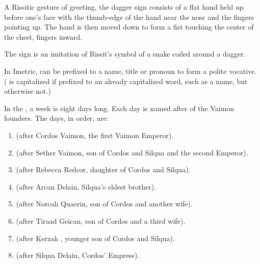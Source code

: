 \begin{gloss}
A Rissitic gesture of greeting, the dagger sign consists of a flat hand held up before one's face with the thumb-edge of the hand near the nose and the fingers pointing up. The hand is then moved down to form a fist touching the center of the chest, fingers inward. 

The sign is an imitation of Rissit's symbol of a snake coiled around a dagger. 
\also{\HriistN}



\gitem{\dai-}
In Imetric, \quo{\dai-} can be prefixed to a name, title or pronoun to form a polite vocative. (\quo{\Dai-} is capitalized if prefixed to an already capitalized word, such as a name, but otherwise not.)



\index{\Corjin}
\index{\Setherab}
\index{\Rebecab}
\index{\Arcab}
\index{\Norquin}
\index{\Tirjin}
\index{\Kerzab}
\index{\Siljin}
In the \ImperialCalendar, a week is eight days long. Each day is named after of the Vaimon founders. %
The days, in order, are:

\begin{enumerate}
	\item \Corjin{} (after Cordos Vaimon, the first Vaimon Emperor).
	\item \Setherab{} (after Sether Vaimon, son of Cordos and Silqua and the second Emperor).
	\item \Rebecab{} (after Rebecca Redcor, daughter of Cordos and Silqua).
	\item \Arcab{} (after Arcan Delain, Silqua's eldest brother).
	\item \Norquin{} (after Norcah Quaerin, son of Cordos and another wife).
	\item \Tirjin{} (after Tiraad Geican, son of Cordos and a third wife).
	\item \Kerzab{} (after Kerzah \Irgel, younger son of Cordos and Silqua).
	\item \Siljin{} (after Silqua Delain, Cordos' Empress). 
\end{enumerate}



\end{gloss}
